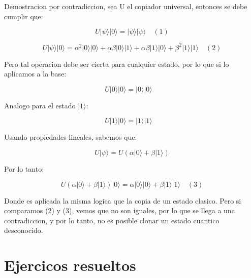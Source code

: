 \documentclass[11pt]{article}
\begin{document}
Demostracion por contradiccion, sea U el copiador universal, entonces se debe cumplir que:

\begin{equation}
    U |\psi\rangle |0\rangle = |\psi\rangle |\psi\rangle \quad (1)
\end{equation}

\begin{equation}
    U |\psi\rangle |0\rangle = \alpha^2 |0\rangle |0\rangle + \alpha \beta |0\rangle |1\rangle + \alpha \beta |1\rangle |0\rangle + \beta^2 |1\rangle |1\rangle \quad (2)
\end{equation}

Pero tal operacion debe ser cierta para cualquier estado, por lo que si lo aplicamos a la base:

\begin{equation}
    U |0\rangle |0\rangle = |0\rangle |0\rangle \quad 
\end{equation}

Analogo para el estado $|1\rangle$:

\begin{equation}
    U |1\rangle |0\rangle = |1\rangle |1\rangle \quad
\end{equation}

Usando propiedades lineales, sabemos que:

\begin{equation}
    U |\psi\rangle = U (\alpha |0\rangle + \beta |1\rangle) 
\end{equation}

Por lo tanto:

\begin{equation}
    U (\alpha |0\rangle + \beta |1\rangle) |0\rangle = \alpha |0\rangle |0\rangle + \beta |1\rangle |1\rangle \quad (3)
\end{equation}

Donde es aplicada la misma logica que la copia de un estado clasico. Pero si comparamos (2) y (3), vemos que no son iguales, por lo que se llega a una contradiccion, y por lo tanto, no es posible clonar un estado cuantico desconocido.

\section{Ejercicos resueltos}
\end{document}

